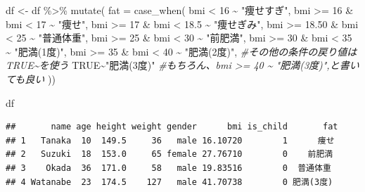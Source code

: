 \documentclass[
]{book}
\newenvironment{Shaded}{\begin{snugshade}}{\end{snugshade}}
\newcommand{\AttributeTok}[1]{\textcolor[rgb]{0.77,0.63,0.00}{#1}}
\newcommand{\CommentTok}[1]{\textcolor[rgb]{0.56,0.35,0.01}{\textit{#1}}}
\newcommand{\ConstantTok}[1]{\textcolor[rgb]{0.00,0.00,0.00}{#1}}
\newcommand{\DecValTok}[1]{\textcolor[rgb]{0.00,0.00,0.81}{#1}}
\newcommand{\FloatTok}[1]{\textcolor[rgb]{0.00,0.00,0.81}{#1}}
\newcommand{\FunctionTok}[1]{\textcolor[rgb]{0.00,0.00,0.00}{#1}}
\newcommand{\NormalTok}[1]{#1}
\newcommand{\OtherTok}[1]{\textcolor[rgb]{0.56,0.35,0.01}{#1}}
\newcommand{\SpecialCharTok}[1]{\textcolor[rgb]{0.00,0.00,0.00}{#1}}
\newcommand{\StringTok}[1]{\textcolor[rgb]{0.31,0.60,0.02}{#1}}
\begin{document}
\begin{Shaded}
\begin{Highlighting}[]
\NormalTok{df }\OtherTok{\textless{}{-}}\NormalTok{ df }\SpecialCharTok{\%\textgreater{}\%} 
  \FunctionTok{mutate}\NormalTok{( }\AttributeTok{fat =} 
           \FunctionTok{case\_when}\NormalTok{(}
\NormalTok{             bmi }\SpecialCharTok{\textless{}} \DecValTok{16} \SpecialCharTok{\textasciitilde{}} \StringTok{"痩せすぎ"}\NormalTok{,}
\NormalTok{             bmi }\SpecialCharTok{\textgreater{}=} \DecValTok{16} \SpecialCharTok{\&}\NormalTok{ bmi }\SpecialCharTok{\textless{}} \DecValTok{17} \SpecialCharTok{\textasciitilde{}} \StringTok{"痩せ"}\NormalTok{,}
\NormalTok{             bmi }\SpecialCharTok{\textgreater{}=} \DecValTok{17} \SpecialCharTok{\&}\NormalTok{ bmi }\SpecialCharTok{\textless{}} \FloatTok{18.5} \SpecialCharTok{\textasciitilde{}} \StringTok{"痩せぎみ"}\NormalTok{,}
\NormalTok{             bmi }\SpecialCharTok{\textgreater{}=} \FloatTok{18.50} \SpecialCharTok{\&}\NormalTok{ bmi }\SpecialCharTok{\textless{}} \DecValTok{25} \SpecialCharTok{\textasciitilde{}} \StringTok{"普通体重"}\NormalTok{,}
\NormalTok{             bmi }\SpecialCharTok{\textgreater{}=} \DecValTok{25} \SpecialCharTok{\&}\NormalTok{ bmi }\SpecialCharTok{\textless{}} \DecValTok{30}  \SpecialCharTok{\textasciitilde{}} \StringTok{"前肥満"}\NormalTok{,}
\NormalTok{             bmi }\SpecialCharTok{\textgreater{}=} \DecValTok{30} \SpecialCharTok{\&}\NormalTok{ bmi }\SpecialCharTok{\textless{}} \DecValTok{35} \SpecialCharTok{\textasciitilde{}} \StringTok{"肥満(1度)"}\NormalTok{,}
\NormalTok{             bmi }\SpecialCharTok{\textgreater{}=} \DecValTok{35} \SpecialCharTok{\&}\NormalTok{ bmi }\SpecialCharTok{\textless{}} \DecValTok{40} \SpecialCharTok{\textasciitilde{}} \StringTok{"肥満(2度)"}\NormalTok{,}
             \CommentTok{\#その他の条件の戻り値はTRUE\textasciitilde{}を使う}
             \ConstantTok{TRUE}\SpecialCharTok{\textasciitilde{}}\StringTok{"肥満(3度)"} \CommentTok{\#もちろん、bmi \textgreater{}= 40 \textasciitilde{} "肥満(3度)",と書いても良い}
\NormalTok{           )) }

\NormalTok{df}
\end{Highlighting}
\end{Shaded}

\begin{verbatim}
##       name age height weight gender      bmi is_child       fat
## 1   Tanaka  10  149.5     36   male 16.10720        1      痩せ
## 2   Suzuki  18  153.0     65 female 27.76710        0    前肥満
## 3    Okada  36  171.0     58   male 19.83516        0  普通体重
## 4 Watanabe  23  174.5    127   male 41.70738        0 肥満(3度)
\end{verbatim}
\end{document}
